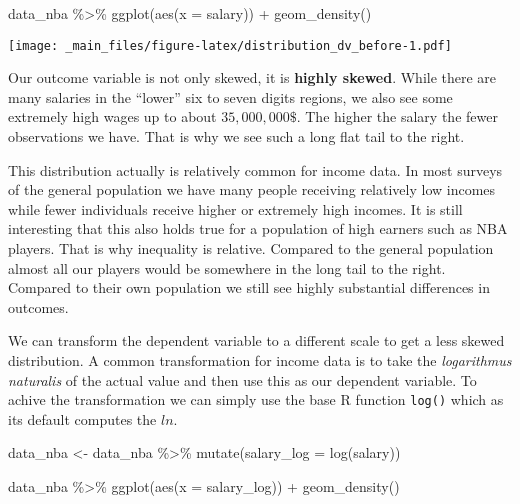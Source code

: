 \documentclass[
]{book}
\newenvironment{Shaded}{\begin{snugshade}}{\end{snugshade}}
\newcommand{\AttributeTok}[1]{\textcolor[rgb]{0.77,0.63,0.00}{#1}}
\newcommand{\FunctionTok}[1]{\textcolor[rgb]{0.00,0.00,0.00}{#1}}
\newcommand{\NormalTok}[1]{#1}
\newcommand{\OtherTok}[1]{\textcolor[rgb]{0.56,0.35,0.01}{#1}}
\newcommand{\SpecialCharTok}[1]{\textcolor[rgb]{0.00,0.00,0.00}{#1}}
\begin{document}
\begin{Shaded}
\begin{Highlighting}[]
\NormalTok{data\_nba }\SpecialCharTok{\%\textgreater{}\%} 
  \FunctionTok{ggplot}\NormalTok{(}\FunctionTok{aes}\NormalTok{(}\AttributeTok{x =}\NormalTok{ salary)) }\SpecialCharTok{+}
  \FunctionTok{geom\_density}\NormalTok{()}
\end{Highlighting}
\end{Shaded}

\texttt{[image: \_main\_files/figure-latex/distribution\_dv\_before-1.pdf]}

Our outcome variable is not only skewed, it is \textbf{highly skewed}. While there
are many salaries in the ``lower'' six to seven digits regions, we also see some
extremely high wages up to about \(35,000,000\$\). The higher the salary the fewer
observations we have. That is why we see such a long flat tail to the right.

This distribution actually is relatively common for income data. In most surveys
of the general population we have many people receiving relatively low incomes
while fewer individuals receive higher or extremely high incomes. It is still
interesting that this also holds true for a population of high earners such as
NBA players. That is why inequality is relative. Compared to the general
population almost all our players would be somewhere in the long tail to the
right. Compared to their own population we still see highly substantial
differences in outcomes.

We can transform the dependent variable to a different scale to get a less
skewed distribution. A common transformation for income data is to take the
\emph{logarithmus naturalis} of the actual value and then use this as our
dependent variable. To achive the transformation we can simply use the base R
function \texttt{log()} which as its default computes the \(ln\).

\begin{Shaded}
\begin{Highlighting}[]
\NormalTok{data\_nba }\OtherTok{\textless{}{-}}\NormalTok{ data\_nba }\SpecialCharTok{\%\textgreater{}\%} 
  \FunctionTok{mutate}\NormalTok{(}\AttributeTok{salary\_log =} \FunctionTok{log}\NormalTok{(salary))}

\NormalTok{data\_nba }\SpecialCharTok{\%\textgreater{}\%} 
  \FunctionTok{ggplot}\NormalTok{(}\FunctionTok{aes}\NormalTok{(}\AttributeTok{x =}\NormalTok{ salary\_log)) }\SpecialCharTok{+}
  \FunctionTok{geom\_density}\NormalTok{()}
\end{Highlighting}
\end{Shaded}
\end{document}
